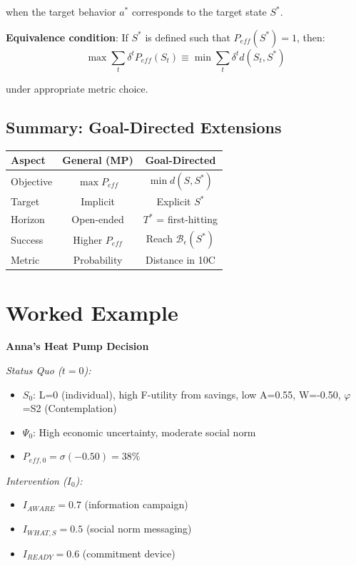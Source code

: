 when the target behavior $a^*$ corresponds to the target state $S^*$.

\textbf{Equivalence condition}: If $S^*$ is defined such that $P_{eff}(S^*) = 1$, then:
\begin{equation}
\max \sum_t \delta^t P_{eff}(S_t) \equiv \min \sum_t \delta^t d(S_t, S^*)
\end{equation}

under appropriate metric choice.

\subsection{Summary: Goal-Directed Extensions}

\begin{center}
\begin{tabular}{|l|c|c|}
\hline
\textbf{Aspect} & \textbf{General (MP)} & \textbf{Goal-Directed} \\
\hline
Objective & $\max P_{eff}$ & $\min d(S, S^*)$ \\
Target & Implicit & Explicit $S^*$ \\
Horizon & Open-ended & $T^*$ = first-hitting \\
Success & Higher $P_{eff}$ & Reach $\mathcal{B}_\epsilon(S^*)$ \\
Metric & Probability & Distance in 10C \\
\hline
\end{tabular}
\end{center}

\section{Worked Example}
\label{sec:mp-example}

\textbf{Anna's Heat Pump Decision}

\textit{Status Quo ($t=0$):}
\begin{itemize}
\item $S_0$: L=0 (individual), high F-utility from savings, low A=0.55, W=-0.50, $\varphi$=S2 (Contemplation)
\item $\Psi_0$: High economic uncertainty, moderate social norm
\item $P_{eff,0} = \sigma(-0.50) = 38\%$
\end{itemize}

\textit{Intervention ($I_0$):}
\begin{itemize}
\item $I_{AWARE} = 0.7$ (information campaign)
\item $I_{WHAT,S} = 0.5$ (social norm messaging)
\item $I_{READY} = 0.6$ (commitment device)
\end{itemize}

